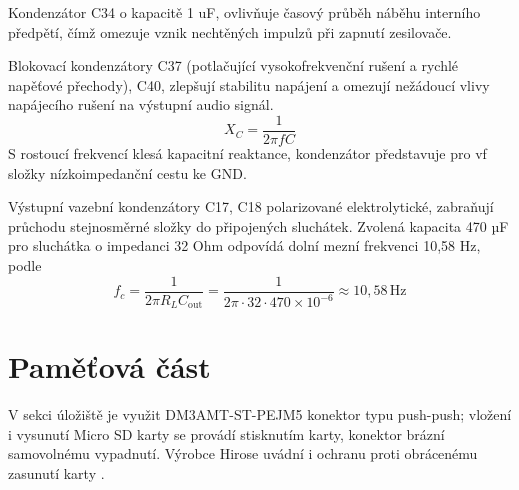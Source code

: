Kondenzátor C34 o kapacitě 1 uF, ovlivňuje časový průběh náběhu interního předpětí, čímž omezuje vznik nechtěných impulzů při zapnutí zesilovače.

Blokovací kondenzátory C37 (potlačující vysokofrekvenční rušení a rychlé napěťové přechody), C40, zlepšují stabilitu napájení a omezují nežádoucí vlivy napájecího rušení na výstupní audio signál.
\begin{equation}
    X_C = \frac{1}{2\pi f C}
    \label{eq:kapacitni_reaktance}
\end{equation}
S rostoucí frekvencí klesá kapacitní reaktance, kondenzátor představuje pro vf složky nízkoimpedanční cestu ke GND. 

Výstupní vazební kondenzátory C17, C18 polarizované elektrolytické, zabraňují průchodu stejnosměrné složky do připojených sluchátek. Zvolená kapacita 470 µF pro sluchátka o impedanci 32 Ohm odpovídá dolní mezní frekvenci 10,58 Hz, podle 
\begin{equation}
    f_c = \frac{1}{2\pi R_L C_{\mathrm{out}}}
    = \frac{1}{2\pi \cdot 32 \cdot 470 \times 10^{-6}}
    \approx 10{,}58\,\mathrm{Hz}
    \label{eq:mezni_frekvence_vystup}
\end{equation}


\section{Paměťová část}
\label{section_pametova_cast}
V sekci úložiště je využit DM3AMT-ST-PEJM5 konektor typu push-push; vložení i vysunutí Micro SD karty se provádí stisknutím karty, konektor brázní samovolnému vypadnutí. Výrobce Hirose uvádní i ochranu proti obrácenému zasunutí karty \cite{datasheet_hirose_dm3}. 

